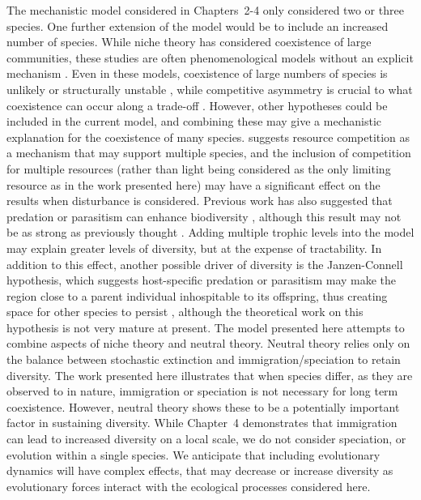 The mechanistic model considered in Chapters~2-4 only considered two or three species. One further extension of the model would be to include an increased number of species. While niche theory has considered coexistence of large communities, these studies are often phenomenological models without an explicit mechanism \citep[e.g. Chapter 1;][]{nattrass2012quantifying,kondoh2001unifying,adler2000space}. Even in these models, coexistence of large numbers of species is unlikely \citep[Chapter~1;][]{nattrass2012quantifying} or structurally unstable \citep{gyllenberg2005impossibility}, while competitive asymmetry is crucial to what coexistence can occur along a trade-off \citep[e.g. Chapter~1;][]{nattrass2012quantifying,adler2000space}. However, other hypotheses could be included in the current model, and combining these may give a mechanistic explanation for the coexistence of many species. \cite{tilman1982resource} suggests resource competition as a mechanism that may support multiple species, and the inclusion of competition for multiple resources (rather than light being considered as the only limiting resource as in the work presented here) may have a significant effect on the results when disturbance is considered. Previous work has also  suggested that predation or parasitism can enhance biodiversity \citep[see review in][]{chase2002interaction}, although this result may not be as strong as previously thought \citep{chesson2008interaction}. Adding multiple trophic levels into the model may explain greater levels of diversity, but at the expense of tractability. In addition to this effect, another possible driver of diversity is the Janzen-Connell hypothesis, which suggests host-specific predation or parasitism may make the region close to a parent individual inhospitable to its offspring, thus creating space for other species to persist \citep{janzen1970herbivores,connell1971role}, although the theoretical work on this hypothesis is not very mature at present. The model presented here attempts to combine aspects of niche theory and neutral theory. Neutral theory relies only on the balance between stochastic extinction and immigration/speciation to retain diversity. The work presented here illustrates that when species differ, as they are observed to in nature, immigration or speciation is not necessary for long term coexistence. However, neutral theory shows these to be a potentially important factor in sustaining diversity. While Chapter~4 demonstrates that immigration can lead to increased diversity on a local scale, we do not consider speciation, or evolution within a single species. We anticipate that including evolutionary dynamics will have complex effects, that may decrease or increase diversity as evolutionary forces interact with the ecological processes considered here.

